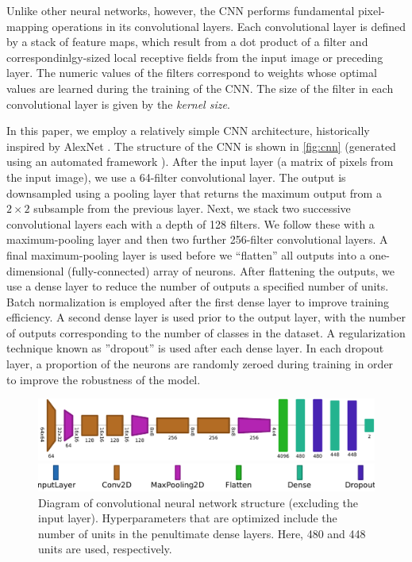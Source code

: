 \documentclass[Journal, letterpaper, DoubleSpace, InsideFigs]{ascelike-new}
\begin{document}
Unlike other neural networks, however, the CNN performs fundamental pixel-mapping operations in its convolutional
layers. Each convolutional layer is defined by a stack of feature maps, which result from a dot product of a filter and
correspondinlgy-sized local receptive fields from the input image or preceding layer.  The numeric values of the filters
correspond to weights whose optimal values are learned during the training of the CNN.  The size of the filter in each
convolutional layer is given by the \textit{kernel size}.

In this paper, we employ a relatively simple CNN architecture, historically inspired by AlexNet \cite{krizhevsky2012imageneta}.
The structure of the CNN is shown in \autoref{fig:cnn} (generated using an automated  framework \cite{bauerle2021net2vis}).
After the input layer (a matrix of pixels from the input image), we use a 64-filter convolutional layer.
The output is downsampled using a pooling layer that returns the maximum output from a $2\times 2$ subsample from the previous layer.
Next, we stack two successive convolutional layers each with a depth of 128 filters.
We follow these with a maximum-pooling layer and then two further 256-filter convolutional layers.
A final maximum-pooling layer is used before we ``flatten'' all outputs into a one-dimensional (fully-connected) array of neurons. 
After flattening the outputs, we use a dense layer to reduce the number of outputs a specified number of units.
Batch normalization \cite{ioffe2015batch} is employed after the first dense layer to improve training efficiency.
A second dense layer is used prior to the output layer, with the number of outputs corresponding to the number of classes in the dataset.
A regularization technique known as ''dropout'' is used after each dense layer.
In each dropout layer, a proportion of the neurons are randomly zeroed during training in order to improve the robustness of the model.
\begin{figure}
    \centering
    \includegraphics[width=.9\textwidth]{net2vis/graph.pdf}
    
    \bigskip
    
    \includegraphics[width=.5\textwidth, trim={4cm 0 0 0}, clip]{figures/net2vis-name-labels/legend}
    \caption{Diagram of convolutional neural network structure (excluding the input layer). Hyperparameters that are
      optimized include the number of units in the penultimate dense layers. Here, 480 and 448 units are used, respectively.}
    \label{fig:cnn}
\end{figure}
\end{document}

